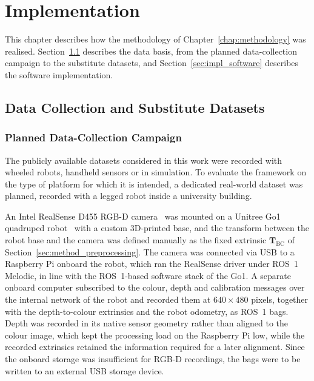 \chapter{Implementation}
\label{chap:implementation}

{\small This chapter describes how the methodology of Chapter~\ref{chap:methodology} was realised. Section~\ref{sec:impl_hardware} describes the data basis, from the planned data-collection campaign to the substitute datasets, and Section~\ref{sec:impl_software} describes the software implementation.\par}

\section{Data Collection and Substitute Datasets}
\label{sec:impl_hardware}

\subsection{Planned Data-Collection Campaign}
\label{subsec:impl_go1_plan}

{\small The publicly available datasets considered in this work were recorded with wheeled robots, handheld sensors or in simulation. To evaluate the framework on the type of platform for which it is intended, a dedicated real-world dataset was planned, recorded with a legged robot inside a university building.\par}

{\small An Intel RealSense D455 RGB-D camera~\cite{intel_realsense_d455} was mounted on a Unitree Go1 quadruped robot~\cite{unitree_go1} with a custom 3D-printed base, and the transform between the robot base and the camera was defined manually as the fixed extrinsic $\mathbf{T}_{\mathrm{BC}}$ of Section~\ref{sec:method_preprocessing}. The camera was connected via USB to a Raspberry Pi onboard the robot, which ran the RealSense driver under ROS~1 Melodic, in line with the ROS~1-based software stack of the Go1. A separate onboard computer subscribed to the colour, depth and calibration messages over the internal network of the robot and recorded them at $640 \times 480$ pixels, together with the depth-to-colour extrinsics and the robot odometry, as ROS~1 bags. Depth was recorded in its native sensor geometry rather than aligned to the colour image, which kept the processing load on the Raspberry Pi low, while the recorded extrinsics retained the information required for a later alignment. Since the onboard storage was insufficient for RGB-D recordings, the bags were to be written to an external USB storage device.\par}

